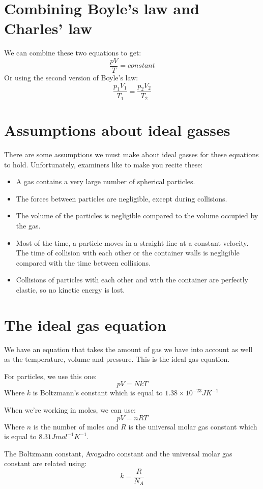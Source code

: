 \documentclass{article}
\begin{document}
\section*{Combining Boyle's law and Charles' law}
We can combine these two equations to get:
\[
	\frac{pV}{T} = constant
\]
Or using the second version of Boyle's law:
\[
	\frac{p_1V_1}{T_1} = \frac{p_2V_2}{T_2}
\]

\section*{Assumptions about ideal gasses}
There are some assumptions we must make about ideal gasses for these equations to hold. Unfortunately, examiners like to make you recite these:

\begin{itemize}
	\item A gas contains a very large number of spherical particles.
	\item The forces between particles are negligible, except during collisions.
	\item The volume of the particles is negligible compared to the volume occupied by the gas.
	\item Most of the time, a particle moves in a straight line at a constant velocity. The time of collision with each other or the container walls is negligible compared with the time between collisions.
	\item Collisions of particles with each other and with the container are perfectly elastic, so no kinetic energy is lost.
\end{itemize}

\section*{The ideal gas equation}
We have an equation that takes the amount of gas we have into account as well as the temperature, volume and pressure. This is the ideal gas equation.

For particles, we use this one:
\[
	pV = NkT
\]	
Where $k$ is Boltzmann's constant which is equal to $1.38 \times 10^{-23}JK^{-1}$

When we're working in moles, we can use:
\[
	pV = nRT
\]
Where $n$ is the number of moles and $R$ is the universal molar gas constant which is equal to $8.31Jmol^{-1}K^{-1}$.

The Boltzmann constant, Avogadro constant and the universal molar gas constant are related using:
\[
	k = \frac{R}{N_A}
\]
\end{document}
